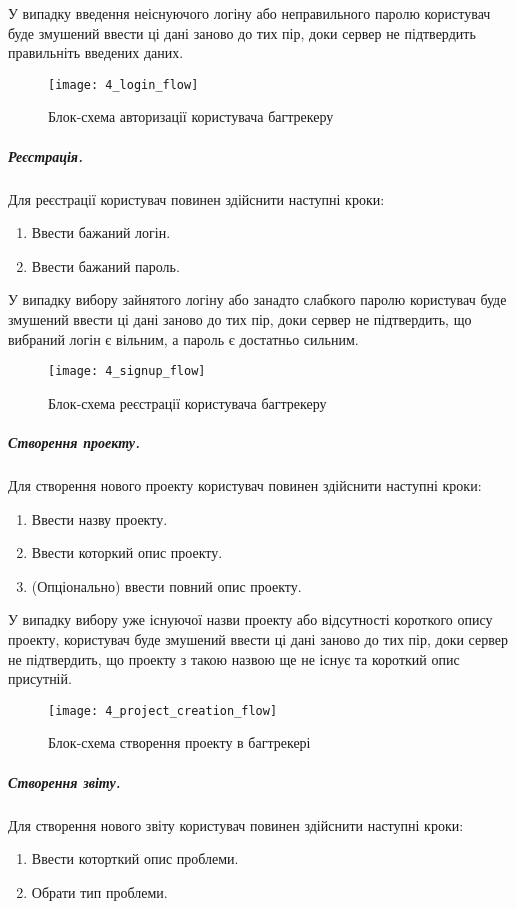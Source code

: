 \documentclass[../main.tex]{subfiles}
\begin{document}
			У випадку введення неіснуючого логіну або неправильного паролю користувач буде змушений ввести ці дані заново до тих пір, доки сервер не підтвердить правильніть введених даних.
			
			\begin{figure}[H]
				\centering
				\texttt{[image: 4\_login\_flow]}
				\caption{Блок-схема авторизації користувача багтрекеру}
			\end{figure}
		
		\subparagraph{Реєстрація.}
			Для реєстрації користувач повинен здійснити наступні кроки:
			\begin{enumerate}
				\item Ввести бажаний логін.
				\item Ввести бажаний пароль.
			\end{enumerate}
			
			У випадку вибору зайнятого логіну або занадто слабкого паролю користувач буде змушений ввести ці дані заново до тих пір, доки сервер не підтвердить, що вибраний логін є вільним, а пароль є достатньо сильним.
			
			\begin{figure}[H]
				\centering
				\texttt{[image: 4\_signup\_flow]}
				\caption{Блок-схема реєстрації користувача багтрекеру}
			\end{figure}
		
		\subparagraph{Створення проекту.}
			Для створення нового проекту користувач повинен здійснити наступні кроки:
			\begin{enumerate}
				\item Ввести назву проекту.
				\item Ввести которкий опис проекту.
				\item (Опціонально) ввести повний опис проекту.
			\end{enumerate}
			
			У випадку вибору уже існуючої назви проекту або відсутності короткого опису проекту, користувач буде змушений ввести ці дані заново до тих пір, доки сервер не підтвердить, що проекту з такою назвою ще не існує та короткий опис присутній.
			
			\begin{figure}[H]
				\centering
				\texttt{[image: 4\_project\_creation\_flow]}
				\caption{Блок-схема створення проекту в багтрекері}
			\end{figure}
		
		\subparagraph{Створення звіту.}
			Для створення нового звіту користувач повинен здійснити наступні кроки:
			\begin{enumerate}
				\item Ввести которткий опис проблеми.
				\item Обрати тип проблеми.
			\end{enumerate}
			
\end{document}
